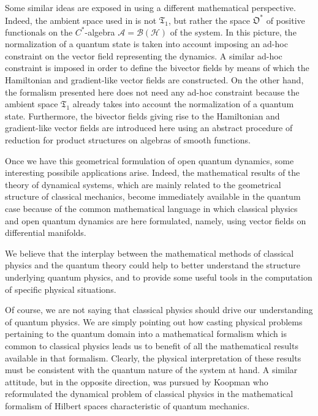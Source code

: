 \documentclass[11pt]{article}
\newcommand{\vsp}{\vspace{0.4cm}}
\newcommand{\appa}{\mathcal{A}}
\newcommand{\obsp}{\mathfrak{O}}
\begin{document}
\vsp

Some similar ideas are exposed in \cite{carinena_clemente-gallardo_jover-galtier_marmo-tensorial_dynamics_on_the_space_of_quantum_states,ciaglia_dicosmo_laudato_marmo-differential_calculus_on_manifolds_with_boundary.applications} using a different mathematical perspective.
Indeed, the ambient space used in \cite{carinena_clemente-gallardo_jover-galtier_marmo-tensorial_dynamics_on_the_space_of_quantum_states,ciaglia_dicosmo_laudato_marmo-differential_calculus_on_manifolds_with_boundary.applications} is not $\mathfrak{T}_{1}$, but rather the space $\obsp^{*}$ of positive functionals on the $C^{*}$-algebra $\appa=\mathcal{B}(\mathcal{H})$ of the system.
In this picture, the normalization of a quantum state is taken into account imposing an ad-hoc constraint on the vector field representing the dynamics.
A similar ad-hoc constraint is imposed in order to define the bivector fields by means of which the Hamiltonian and gradient-like vector fields are constructed.
On the other hand, the formalism presented here does not need any ad-hoc constraint because the ambient space $\mathfrak{T}_{1}$ already takes into account the normalization of a quantum state.
Furthermore, the bivector fields giving rise to the Hamiltonian and gradient-like vector fields are introduced here using an abstract procedure of reduction for product structures on algebras of smooth functions.

\vsp

Once we have this geometrical formulation of open quantum dynamics, some interesting possibile applications arise.
Indeed, the mathematical results of the theory of dynamical systems, which are mainly related to the geometrical structure of classical mechanics,  become immediately available in the quantum case because of the common mathematical language in which classical physics and open quantum dynamics are here formulated, namely, using vector fields on differential manifolds.
  
We believe that the interplay between the mathematical methods of classical physics and the quantum theory could help to  better understand the structure underlying quantum physics, and to provide some useful tools in the computation of specific physical situations.

Of course, we are not saying that classical physics should drive our understanding of quantum physics.
We are simply pointing out how casting physical problems pertaining to the quantum domain into a mathematical formalism which is common to classical physics leads us to benefit of all the mathematical results available in that formalism.
Clearly, the physical interpretation of these results must be consistent with the quantum nature of the system at hand.
A similar attitude, but in the opposite direction, was pursued by Koopman \cite{koopman-hamiltonian_systems_and_transformations_in_hilbert_space} who reformulated the dynamical problem of classical physics in the mathematical formalism of Hilbert spaces characteristic of quantum mechanics.
\end{document}
